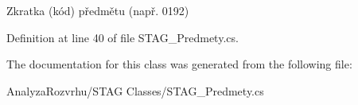 Zkratka (kód) předmětu (např. 0192) 



Definition at line 40 of file S\+T\+A\+G\+\_\+\+Predmety.\+cs.



The documentation for this class was generated from the following file\+:\begin{DoxyCompactItemize}
\item 
Analyza\+Rozvrhu/\+S\+T\+A\+G Classes/S\+T\+A\+G\+\_\+\+Predmety.\+cs\end{DoxyCompactItemize}
